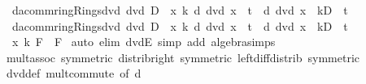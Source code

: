 \begin{isabellebody}
\ \ {\isachardoublequoteopen}{\isacharparenleft}{\kern0pt}d{\isacharcolon}{\kern0pt}{\isacharcolon}{\kern0pt}{\isacharprime}{\kern0pt}a{\isacharcolon}{\kern0pt}{\isacharcolon}{\kern0pt}{\isacharbraceleft}{\kern0pt}comm{\isacharunderscore}{\kern0pt}ring{\isacharcomma}{\kern0pt}Rings{\isachardot}{\kern0pt}dvd{\isacharbraceright}{\kern0pt}{\isacharparenright}{\kern0pt}\ dvd\ D\ {\isasymLongrightarrow}\ {\isasymforall}x\ k{\isachardot}{\kern0pt}\ {\isacharparenleft}{\kern0pt}d\ dvd\ x\ {\isacharplus}{\kern0pt}\ t{\isacharparenright}{\kern0pt}\ {\isacharequal}{\kern0pt}\ {\isacharparenleft}{\kern0pt}d\ dvd\ {\isacharparenleft}{\kern0pt}x\ {\isacharminus}{\kern0pt}\ k{\isacharasterisk}{\kern0pt}D{\isacharparenright}{\kern0pt}\ {\isacharplus}{\kern0pt}\ t{\isacharparenright}{\kern0pt}{\isachardoublequoteclose}\isanewline
\ \ {\isachardoublequoteopen}{\isacharparenleft}{\kern0pt}d{\isacharcolon}{\kern0pt}{\isacharcolon}{\kern0pt}{\isacharprime}{\kern0pt}a{\isacharcolon}{\kern0pt}{\isacharcolon}{\kern0pt}{\isacharbraceleft}{\kern0pt}comm{\isacharunderscore}{\kern0pt}ring{\isacharcomma}{\kern0pt}Rings{\isachardot}{\kern0pt}dvd{\isacharbraceright}{\kern0pt}{\isacharparenright}{\kern0pt}\ dvd\ D\ {\isasymLongrightarrow}\ {\isasymforall}x\ k{\isachardot}{\kern0pt}\ {\isacharparenleft}{\kern0pt}{\isasymnot}d\ dvd\ x\ {\isacharplus}{\kern0pt}\ t{\isacharparenright}{\kern0pt}\ {\isacharequal}{\kern0pt}\ {\isacharparenleft}{\kern0pt}{\isasymnot}d\ dvd\ {\isacharparenleft}{\kern0pt}x\ {\isacharminus}{\kern0pt}\ k{\isacharasterisk}{\kern0pt}D{\isacharparenright}{\kern0pt}\ {\isacharplus}{\kern0pt}\ t{\isacharparenright}{\kern0pt}{\isachardoublequoteclose}\isanewline
\ \ {\isachardoublequoteopen}{\isasymforall}x\ k{\isachardot}{\kern0pt}\ F\ {\isacharequal}{\kern0pt}\ F{\isachardoublequoteclose}\isanewline
%
\isadelimproof
%
\endisadelimproof
%
\isatagproof
{}\isamarkupfalse%
\ {\isacharparenleft}{\kern0pt}auto\ elim{\isacharbang}{\kern0pt}{\isacharcolon}{\kern0pt}\ dvdE\ simp\ add{\isacharcolon}{\kern0pt}\ algebra{\isacharunderscore}{\kern0pt}simps{\isacharparenright}{\kern0pt}\isanewline
{}\isamarkupfalse%
\ mult{\isachardot}{\kern0pt}assoc\ {\isacharbrackleft}{\kern0pt}symmetric{\isacharbrackright}{\kern0pt}\ distrib{\isacharunderscore}{\kern0pt}right\ {\isacharbrackleft}{\kern0pt}symmetric{\isacharbrackright}{\kern0pt}\ left{\isacharunderscore}{\kern0pt}diff{\isacharunderscore}{\kern0pt}distrib\ {\isacharbrackleft}{\kern0pt}symmetric{\isacharbrackright}{\kern0pt}\isanewline
{}\isamarkupfalse%
\ dvd{\isacharunderscore}{\kern0pt}def\ mult{\isachardot}{\kern0pt}commute\ {\isacharbrackleft}{\kern0pt}of\ d{\isacharbrackright}{\kern0pt}\ \isanewline

\end{isabellebody}
